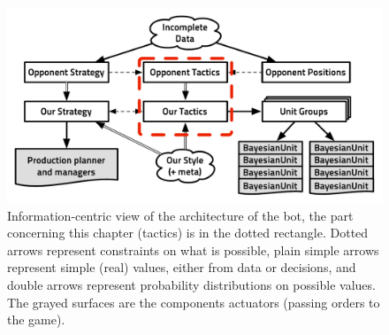 \begin{figure}[!ht]
\begin{center}
\includegraphics[width=13cm]{images/starcraft_bbq_concept_TACTICS.pdf}
\end{center}
\label{fig:conceptTACTICS}
\caption{Information-centric view of the architecture of the bot, the part concerning this chapter (tactics) is in the dotted rectangle. Dotted arrows represent constraints on what is possible, plain simple arrows represent simple (real) values, either from data or decisions, and double arrows represent probability distributions on possible values. The grayed surfaces are the components actuators (passing orders to the game).}
\end{figure}

